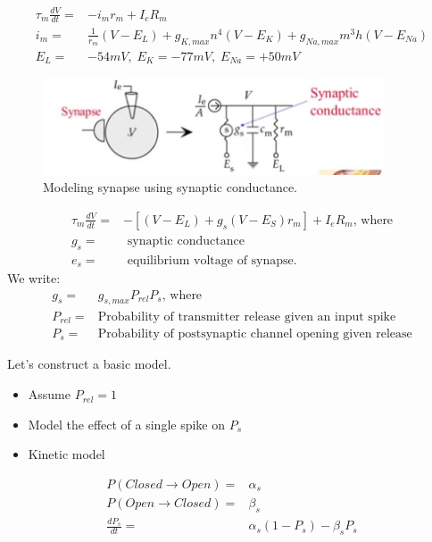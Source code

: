 \documentclass[]{article}
\begin{document}
\begin{align*}
	\tau_m \frac{dV}{dt} =& -i_m r_m + I_e R_m\\
	i_m =& \frac{1}{r_m} (V-E_L) + g_{K,max} n^4 (V-E_K) + g_{Na,max}m^3 h (V-E_{Na})\\
	E_L =& -54 mV,\; E_K = -77mV,\; E_{Na} = + 50mV
\end{align*}

\begin{figure}[H]
	\caption[Modeling synapse using synaptic conductance]{Modeling synapse using synaptic conductance.}
	\includegraphics[width=0.9\textwidth]{hh-synapse}
\end{figure}

\begin{align*}
	\tau_m \frac{dV}{dt} =& -[(V-E_L)+g_s(V-E_S)r_m] + I_e R_m \text{, where}\\
	g_s =& \text{ synaptic conductance}\\
	e_s =& \text{ equilibrium voltage of synapse.}
\end{align*}
We write:
\begin{align*}
		g_s =& g_{s,max}P_{rel}P_{s} \text{, where}\\
		P_{rel}=& \text{Probability of transmitter release given an input spike}\\
		P_{s}=& \text{Probability of postsynaptic channel opening given release}
\end{align*}

Let's construct a basic model.
\begin{itemize}
	\item Assume $P_{rel}=1$
	\item Model the effect of a single spike on $P_s$
	\item Kinetic model
\end{itemize}

\begin{align*}
	P(Closed\rightarrow Open)=&\alpha_s\\
	P(Open\rightarrow Closed)=&\beta_s\\
	\frac{dP_s}{dt}=&\alpha_s(1-P_s)-\beta_s P_s
\end{align*}
\end{document}
